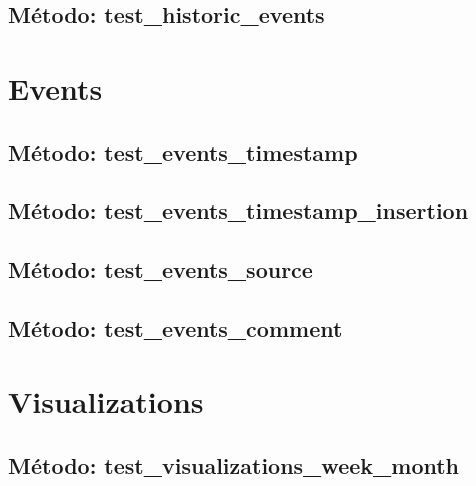 \subsection{\quad Método: test\_historic\_events}



\section{\quad Events}



\subsection{\quad Método: test\_events\_timestamp}



\subsection{\quad Método: test\_events\_timestamp\_insertion}



\subsection{\quad Método: test\_events\_source}



\subsection{\quad Método: test\_events\_comment}



\section{\quad Visualizations}



\subsection{\quad Método: test\_visualizations\_week\_month}

